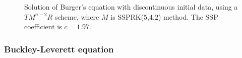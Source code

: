 \begin{figure}[t!]
    \centering
    \caption{Solution of Burger's equation with discontinuous initial data, using a $ TM^{n-2}R $ scheme, where $ M $ is SSPRK($ 5 $,$ 4 $,$ 2 $) method. The SSP coefficient is $ c = 1.97 $.}
    \label{fig5.4}
\end{figure}

\subsubsection{Buckley-Leverett equation}\label{subsubsec:B-L}
